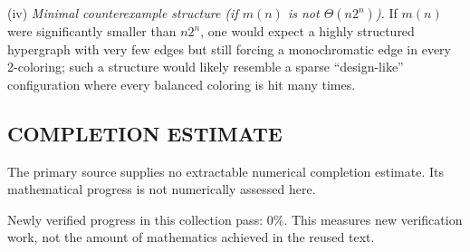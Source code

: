 (iv) \emph{Minimal counterexample structure (if $m(n)$ is not $\Theta(n2^n)$).}
If $m(n)$ were significantly smaller than $n2^n$, one would expect a highly
structured hypergraph with very few edges but still forcing a monochromatic edge
in every 2-coloring; such a structure would likely resemble a sparse “design-like”
configuration where every balanced coloring is hit many times.




\subsection*{COMPLETION ESTIMATE}
The primary source supplies no extractable numerical completion estimate. Its mathematical progress is not numerically assessed here.

Newly verified progress in this collection pass: $0\%$. This measures new verification work, not the amount of mathematics achieved in the reused text.

